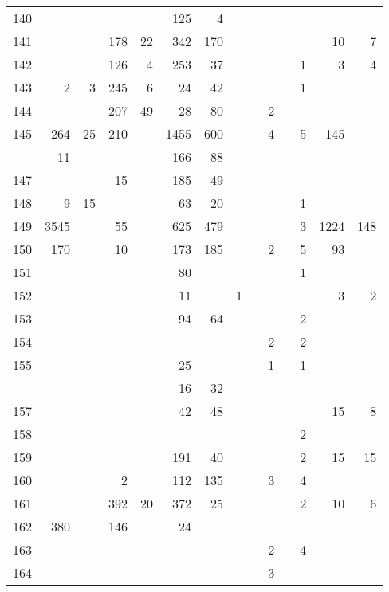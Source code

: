 \documentclass[
]{article}
\begin{document}
\begin{longtable}[l]{rrrrrrrrrrrrrr}
140 &  &  &  &  & 125 & 4 &  &  &  &  &  &  & \\
\addlinespace
\rowcolor{lightgray}  141 &  &  & 178 & 22 & 342 & 170 &  &  &  &  &  & 10 & 7\\
142 &  &  & 126 & 4 & 253 & 37 &  &  &  &  & 1 & 3 & 4\\
\rowcolor{lightgray}  143 & 2 & 3 & 245 & 6 & 24 & 42 &  &  &  &  & 1 &  & \\
144 &  &  & 207 & 49 & 28 & 80 &  &  & 2 &  &  &  & \\
\rowcolor{lightgray}  145 & 264 & 25 & 210 &  & 1455 & 600 &  &  & 4 &  & 5 & 145 & \\
\addlinespace
146 & 11 &  &  &  & 166 & 88 &  &  &  &  &  &  & \\
\rowcolor{lightgray}  147 &  &  & 15 &  & 185 & 49 &  &  &  &  &  &  & \\
148 & 9 & 15 &  &  & 63 & 20 &  &  &  &  & 1 &  & \\
\rowcolor{lightgray}  149 & 3545 &  & 55 &  & 625 & 479 &  &  &  &  & 3 & 1224 & 148\\
150 & 170 &  & 10 &  & 173 & 185 &  &  & 2 &  & 5 & 93 & \\
\addlinespace
\rowcolor{lightgray}  151 &  &  &  &  & 80 &  &  &  &  &  & 1 &  & \\
152 &  &  &  &  & 11 &  & 1 &  &  &  &  & 3 & 2\\
\rowcolor{lightgray}  153 &  &  &  &  & 94 & 64 &  &  &  &  & 2 &  & \\
154 &  &  &  &  &  &  &  &  & 2 &  & 2 &  & \\
\rowcolor{lightgray}  155 &  &  &  &  & 25 &  &  &  & 1 &  & 1 &  & \\
\addlinespace
156 &  &  &  &  & 16 & 32 &  &  &  &  &  &  & \\
\rowcolor{lightgray}  157 &  &  &  &  & 42 & 48 &  &  &  &  &  & 15 & 8\\
158 &  &  &  &  &  &  &  &  &  &  & 2 &  & \\
\rowcolor{lightgray}  159 &  &  &  &  & 191 & 40 &  &  &  &  & 2 & 15 & 15\\
160 &  &  & 2 &  & 112 & 135 &  &  & 3 &  & 4 &  & \\
\addlinespace
\rowcolor{lightgray}  161 &  &  & 392 & 20 & 372 & 25 &  &  &  &  & 2 & 10 & 6\\
162 & 380 &  & 146 &  & 24 &  &  &  &  &  &  &  & \\
\rowcolor{lightgray}  163 &  &  &  &  &  &  &  &  & 2 &  & 4 &  & \\
164 &  &  &  &  &  &  &  &  & 3 &  &  &  & \\

\end{longtable}
\end{document}
